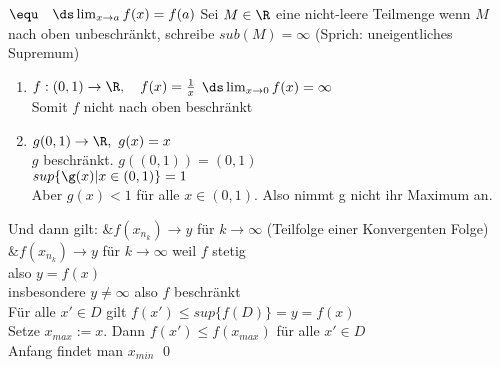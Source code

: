 $\equ \quad \ds\lim_{x \to a} f(x) = f(a)$
Sei $M \in \R$ eine nicht-leere Teilmenge wenn $M$ nach oben unbeschränkt, schreibe $sub(M) = \infty$ (Sprich: uneigentliches Supremum)\\
\bsp
\begin{enumerate}
\item{$f: (0, 1) \to \R, \quad f(x) = \frac{1}{x}$ %
$\ds\lim_{x \to 0} f(x) = \infty$\\
Somit $f$ nicht nach oben beschränkt}
\item{$g(0,1) \to \R, \ g(x) = x$\\
$g$ beschränkt. $g((0,1)) = (0,1)$\\
$sup \{\g(x) | x \in (0, 1) \} = 1$\\
Aber $g(x) < 1$ für alle $x \in (0, 1)$. Also nimmt g nicht ihr Maximum an.}
\end{enumerate}
Und dann gilt: &$f(x_n_k) \to y$ für $k \to \infty$ (Teilfolge einer Konvergenten Folge)\\
			   &$f(x_n_k) \to y$ für $k \to \infty$ weil $f$ stetig\\
also $y = f(x)$\\
insbesondere $y \neq \infty$ also $f$ beschränkt\\
Für alle $x' \in D$ gilt $f(x') \leq sup \{f(D)\} = y = f(x)$\\
Setze $x_{max} := x$. Dann $f(x') \leq f(x_{max})$ für alle $x' \in D$\\
Anfang findet man $x_{min}$ \qed